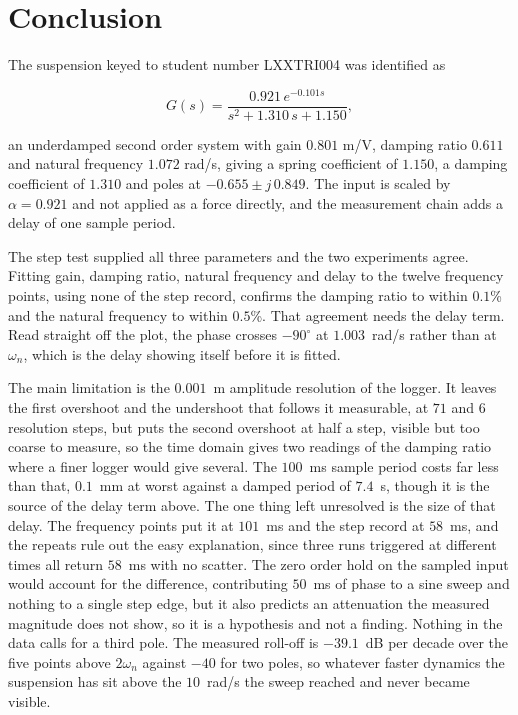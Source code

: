 \section{Conclusion}

The suspension keyed to student number LXXTRI004 was identified as

\begin{equation}
    G(s) = \frac{0.921\,e^{-0.101s}}{s^2 + 1.310\,s + 1.150},
\end{equation}

an underdamped second order system with gain $0.801$ m/V, damping ratio $0.611$ and natural
frequency $1.072$ rad/s, giving a spring coefficient of $1.150$, a damping coefficient of
$1.310$ and poles at $-0.655 \pm j\,0.849$. The input is scaled by $\alpha = 0.921$ and not
applied as a force directly, and the measurement chain adds a delay of one sample period.

The step test supplied all three parameters and the two experiments agree. Fitting gain,
damping ratio, natural frequency and delay to the twelve frequency points, using none of the
step record, confirms the damping ratio to within $0.1$\% and the natural frequency to within
$0.5$\%. That agreement needs the delay term. Read straight off the plot, the phase crosses
$-90^\circ$ at $1.003$~rad/s rather than at $\omega_n$, which is the delay showing itself
before it is fitted.

The main limitation is the $0.001$~m amplitude resolution of the logger. It leaves the first
overshoot and the undershoot that follows it measurable, at $71$ and $6$ resolution steps, but
puts the second overshoot at half a step, visible but too coarse to measure, so the time domain gives two
readings of the damping ratio where a finer logger would give several. The $100$~ms sample
period costs far less than that, $0.1$~mm at worst against a damped period of $7.4$~s, though
it is the source of the delay term above. The one thing left unresolved is the size of that
delay. The frequency points put it at $101$~ms and the step record at $58$~ms, and the repeats
rule out the easy explanation, since three runs triggered at different times all return $58$~ms
with no scatter. The zero order hold on the sampled input would account for the difference,
contributing $50$~ms of phase to a sine sweep and nothing to a single step edge, but it also
predicts an attenuation the measured magnitude does not show, so it is a hypothesis and not a
finding. Nothing in the data calls for a third pole. The measured roll-off is $-39.1$~dB per
decade over the five points above $2\omega_n$ against $-40$ for two poles, so whatever faster
dynamics the suspension has sit above the $10$~rad/s the sweep reached and never became
visible.